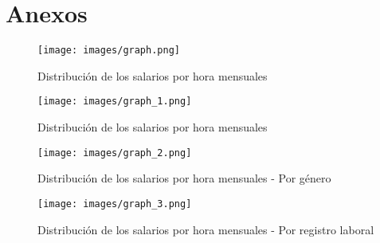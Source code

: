 \documentclass[11pt,oneside]{article}
\begin{document}
	\newpage
	
	
	
	\newpage
	\appendix
	\setcounter{table}{0}
	\renewcommand{\tablename}{Cuadro}
	\renewcommand{\figurename}{Figura}
	\renewcommand{\thetable}{A\arabic{table}}
	\setcounter{figure}{0}
	\renewcommand{\thefigure}{A\arabic{figure}}

\section{Anexos}

\begin{figure}[H]
    \centering
    \caption{Distribución de los salarios por hora mensuales}
    \label{fig:graph}
        \texttt{[image: images/graph.png]} \\
\end{figure}


\begin{figure}[H]
    \centering
    \caption{Distribución de los salarios por hora mensuales}
    \label{fig:graph_1}
        \texttt{[image: images/graph\_1.png]} \\
\end{figure}


\begin{figure}[H]
    \centering
    \caption{Distribución de los salarios por hora mensuales - Por género}
    \label{fig:graph_2}
        \texttt{[image: images/graph\_2.png]} \\
\end{figure}



\begin{figure}[H]
    \centering
    \caption{Distribución de los salarios por hora mensuales - Por registro laboral}
    \label{fig:graph_3}
        \texttt{[image: images/graph\_3.png]} \\
\end{figure}
\end{document}
